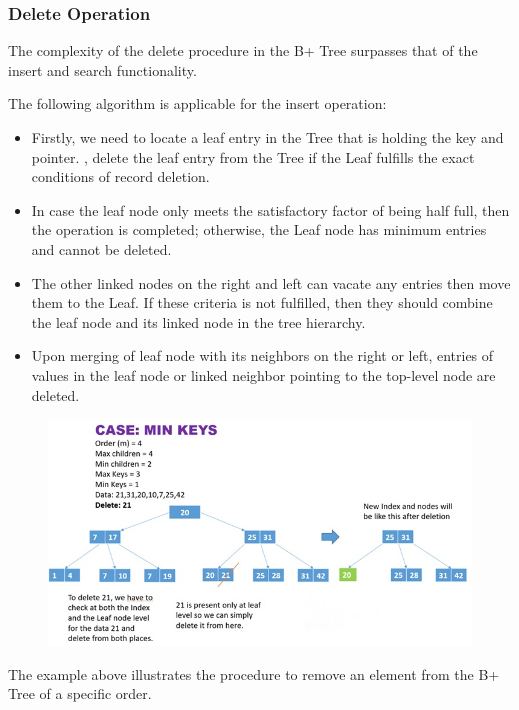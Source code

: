 \documentclass[11pt, a4paper]{article}
\begin{document}
\subsubsection{Delete Operation}

\noindent The complexity of the delete procedure in the B+ Tree surpasses that of the insert and search functionality.

\noindent The following algorithm is applicable for the insert operation:

\begin{itemize}
    \item Firstly, we need to locate a leaf entry in the Tree that is holding the key and pointer. , delete the leaf entry from the Tree if the Leaf fulfills the exact conditions of record deletion.
    \item In case the leaf node only meets the satisfactory factor of being half full, then the operation is completed; otherwise, the Leaf node has minimum entries and cannot be deleted.
    \item The other linked nodes on the right and left can vacate any entries then move them to the Leaf. If these criteria is not fulfilled, then they should combine the leaf node and its linked node in the tree hierarchy.
    \item Upon merging of leaf node with its neighbors on the right or left, entries of values in the leaf node or linked neighbor pointing to the top-level node are deleted.
\end{itemize}

\begin{figure}[h]
    \centering
    \includegraphics[scale=.5]{del1.jpeg}
    \label{del1}
\end{figure}

\noindent The example above illustrates the procedure to remove an element from the B+ Tree of a specific order.
\end{document}
